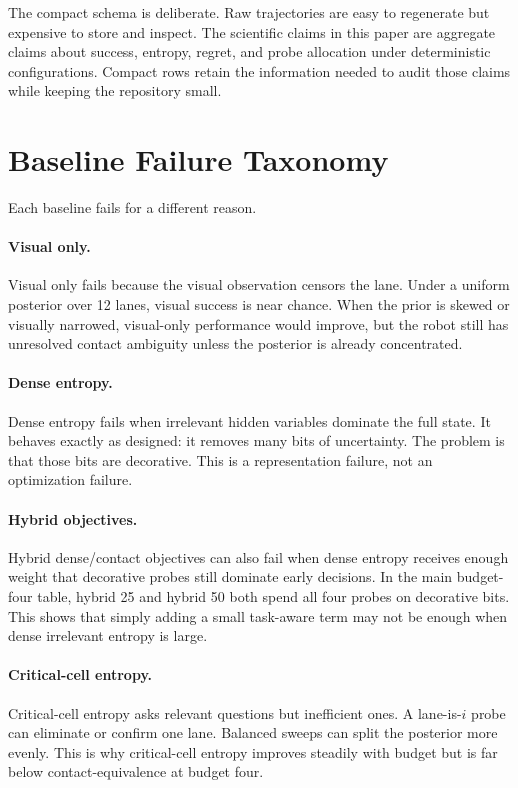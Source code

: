 \documentclass{article}
\begin{document}
The compact schema is deliberate. Raw trajectories are easy to regenerate but expensive to store and inspect. The scientific claims in this paper are aggregate claims about success, entropy, regret, and probe allocation under deterministic configurations. Compact rows retain the information needed to audit those claims while keeping the repository small.

\section{Baseline Failure Taxonomy}

Each baseline fails for a different reason.

\paragraph{Visual only.}
Visual only fails because the visual observation censors the lane. Under a uniform posterior over 12 lanes, visual success is near chance. When the prior is skewed or visually narrowed, visual-only performance would improve, but the robot still has unresolved contact ambiguity unless the posterior is already concentrated.

\paragraph{Dense entropy.}
Dense entropy fails when irrelevant hidden variables dominate the full state. It behaves exactly as designed: it removes many bits of uncertainty. The problem is that those bits are decorative. This is a representation failure, not an optimization failure.

\paragraph{Hybrid objectives.}
Hybrid dense/contact objectives can also fail when dense entropy receives enough weight that decorative probes still dominate early decisions. In the main budget-four table, hybrid 25 and hybrid 50 both spend all four probes on decorative bits. This shows that simply adding a small task-aware term may not be enough when dense irrelevant entropy is large.

\paragraph{Critical-cell entropy.}
Critical-cell entropy asks relevant questions but inefficient ones. A lane-is-$i$ probe can eliminate or confirm one lane. Balanced sweeps can split the posterior more evenly. This is why critical-cell entropy improves steadily with budget but is far below contact-equivalence at budget four.
\end{document}
